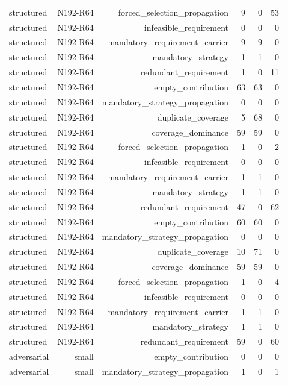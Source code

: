 {\begin{longtable}{lrrrrr}
structured & N192-R64 & forced\_selection\_propagation & 9 & 0 & 53 \\
structured & N192-R64 & infeasible\_requirement & 0 & 0 & 0 \\
structured & N192-R64 & mandatory\_requirement\_carrier & 9 & 9 & 0 \\
structured & N192-R64 & mandatory\_strategy & 1 & 1 & 0 \\
structured & N192-R64 & redundant\_requirement & 1 & 0 & 11 \\
structured & N192-R64 & empty\_contribution & 63 & 63 & 0 \\
structured & N192-R64 & mandatory\_strategy\_propagation & 0 & 0 & 0 \\
structured & N192-R64 & duplicate\_coverage & 5 & 68 & 0 \\
structured & N192-R64 & coverage\_dominance & 59 & 59 & 0 \\
structured & N192-R64 & forced\_selection\_propagation & 1 & 0 & 2 \\
structured & N192-R64 & infeasible\_requirement & 0 & 0 & 0 \\
structured & N192-R64 & mandatory\_requirement\_carrier & 1 & 1 & 0 \\
structured & N192-R64 & mandatory\_strategy & 1 & 1 & 0 \\
structured & N192-R64 & redundant\_requirement & 47 & 0 & 62 \\
structured & N192-R64 & empty\_contribution & 60 & 60 & 0 \\
structured & N192-R64 & mandatory\_strategy\_propagation & 0 & 0 & 0 \\
structured & N192-R64 & duplicate\_coverage & 10 & 71 & 0 \\
structured & N192-R64 & coverage\_dominance & 59 & 59 & 0 \\
structured & N192-R64 & forced\_selection\_propagation & 1 & 0 & 4 \\
structured & N192-R64 & infeasible\_requirement & 0 & 0 & 0 \\
structured & N192-R64 & mandatory\_requirement\_carrier & 1 & 1 & 0 \\
structured & N192-R64 & mandatory\_strategy & 1 & 1 & 0 \\
structured & N192-R64 & redundant\_requirement & 59 & 0 & 60 \\
adversarial & small & empty\_contribution & 0 & 0 & 0 \\
adversarial & small & mandatory\_strategy\_propagation & 1 & 0 & 1 \\

\end{longtable}}
